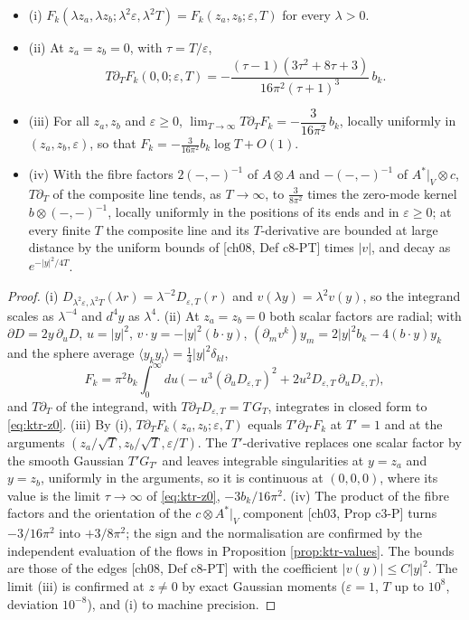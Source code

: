 \begin{proposition}
\label{prop:ktr-composite}
\begin{itemize}
\item (i) $F_k(\lambda z_a,\lambda z_b;\lambda^2\varepsilon,\lambda^2T)=F_k(z_a,z_b;\varepsilon,T)$ for every $\lambda>0$.
\item (ii) At $z_a=z_b=0$, with $\tau=T/\varepsilon$,
\begin{equation}
T\partial_TF_k(0,0;\varepsilon,T)=-\frac{(\tau-1)(3\tau^2+8\tau+3)}{16\pi^2(\tau+1)^3}\,b_k .
\label{eq:ktr-z0}
\end{equation}
\item (iii) For all $z_a,z_b$ and $\varepsilon\ge0$, $\lim_{T\to\infty}T\partial_TF_k=-\dfrac{3}{16\pi^2}\,b_k$, locally uniformly in $(z_a,z_b,\varepsilon)$, so that $F_k=-\tfrac{3}{16\pi^2}b_k\log T+O(1)$.
\item (iv) With the fibre factors $2(-,-)^{-1}$ of $A\otimes A$ and $-(-,-)^{-1}$ of $A^*|_V\otimes c$, $T\partial_T$ of the composite line tends, as $T\to\infty$, to $\tfrac{3}{8\pi^2}$ times the zero-mode kernel $b\otimes(-,-)^{-1}$, locally uniformly in the positions of its ends and in $\varepsilon\ge0$; at every finite $T$ the composite line and its $T$-derivative are bounded at large distance by the uniform bounds of [ch08, Def c8-PT] times $|v|$, and decay as $e^{-|y|^2/4T}$.
\end{itemize}
\end{proposition}

\begin{proof}
(i) $D_{\lambda^2\varepsilon,\lambda^2T}(\lambda r)=\lambda^{-2}D_{\varepsilon,T}(r)$ and $v(\lambda y)=\lambda^2v(y)$, so the integrand scales as $\lambda^{-4}$ and $d^4y$ as $\lambda^4$. (ii) At $z_a=z_b=0$ both scalar factors are radial; with $\partial D=2y\,\partial_uD$, $u=|y|^2$, $v\cdot y=-|y|^2(b\cdot y)$, $(\partial_mv^k)y_m=2|y|^2b_k-4(b\cdot y)y_k$ and the sphere average $\langle y_ky_l\rangle=\tfrac14|y|^2\delta_{kl}$,
\[
F_k=\pi^2b_k\int_0^\infty du\,\big(-u^3(\partial_uD_{\varepsilon,T})^2+2u^2D_{\varepsilon,T}\,\partial_uD_{\varepsilon,T}\big),
\]
and $T\partial_T$ of the integrand, with $T\partial_TD_{\varepsilon,T}=T\,G_T$, integrates in closed form to \eqref{eq:ktr-z0}. (iii) By (i), $T\partial_TF_k(z_a,z_b;\varepsilon,T)$ equals $T'\partial_{T'}F_k$ at $T'=1$ and at the arguments $(z_a/\sqrt T,z_b/\sqrt T,\varepsilon/T)$. The $T'$-derivative replaces one scalar factor by the smooth Gaussian $T'G_{T'}$ and leaves integrable singularities at $y=z_a$ and $y=z_b$, uniformly in the arguments, so it is continuous at $(0,0,0)$, where its value is the limit $\tau\to\infty$ of \eqref{eq:ktr-z0}, $-3b_k/16\pi^2$. (iv) The product of the fibre factors and the orientation of the $c\otimes A^*|_V$ component [ch03, Prop c3-P] turns $-3/16\pi^2$ into $+3/8\pi^2$; the sign and the normalisation are confirmed by the independent evaluation of the flows in Proposition \ref{prop:ktr-values}. The bounds are those of the edges [ch08, Def c8-PT] with the coefficient $|v(y)|\le C|y|^2$. The limit (iii) is confirmed at $z\neq0$ by exact Gaussian moments ($\varepsilon=1$, $T$ up to $10^8$, deviation $10^{-8}$), and (i) to machine precision.
\end{proof}

